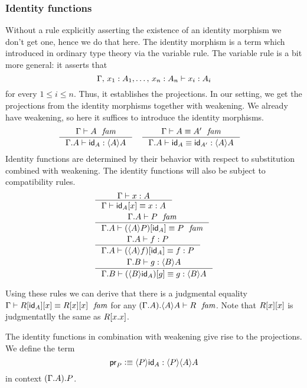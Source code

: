 \subsubsection{Identity functions}
Without a rule explicitly asserting the existence of an identity morphism we don't
get one, hence we do that here. The identity morphism is a term which introduced
in ordinary type theory via the variable rule. The variable rule is a bit more
general: it asserts that
\begin{equation*}
\jterm{\Gamma,\,x_1:A_1,\ldots,\,x_n:A_n}{A_i}{x_i}
\end{equation*}
for every $1\leq i\leq n$. Thus, it establishes the projections. In our setting,
we get the projections from the identity morphisms together with weakening. We
already have weakening, so here it suffices to introduce the identity morphisms.
\begin{align}
& \inference{\jfam{\Gamma}{A}}{\jterm{\ctxext{\Gamma}{A}}{\ctxwk{A}{A}}{\idfunc[A]}}
& & \inference{\jfameq{\Gamma}{A}{A'}}{\jtermeq{\ctxext{\Gamma}{A}}{\ctxwk{A}{A}}{\idfunc[A]}{\idfunc[A']}}
\end{align}
Identity functions are determined by their behavior with respect to substitution combined with
weakening. The identity functions will also be subject to compatibility rules.
\begin{align}
& \inference{\jterm{\Gamma}{A}{x}}{\jtermeq{\Gamma}{A}{\subst{x}{\idfunc[A]}}{x}}\\
& \inference{\jfam{\ctxext{\Gamma}{A}}{P}}{\jfameq{\ctxext{\Gamma}{A}}{\subst{\idfunc[A]}{\ctxwk{A}{P}}}{P}}\\
& \inference{\jterm{\ctxext{\Gamma}{A}}{P}{f}}{\jtermeq{\ctxext{\Gamma}{A}}{P}{\subst{\idfunc[A]}{\ctxwk{A}{f}}}{f}} \\
& \inference{\jterm{\ctxext{\Gamma}{B}}{\ctxwk{B}{A}}{g}}{\jtermeq{\ctxext{\Gamma}{B}}{\ctxwk{B}{A}}{\subst{g}{\ctxwk{B}{\idfunc[A]}}}{g}}
\end{align}

Using these rules we can derive that there is a judgmental equality 
$\jfameq{\Gamma}{\subst{x}{{\idfunc[A]}{R}}}
{\subst{x}{{x}{R}}}$ for any $\jfam{\ctxext{{\Gamma}{A}}{\ctxwk{A}{A}}}{R}$. 
Note that $\subst{x}{{x}{R}}$ is judgmentatlly the same as
$\subst{\ctxext{x}{x}}{R}$.

The identity functions in combination with weakening give rise to the projections.
We define the term
\begin{equation*}
\proj P \defeq \ctxwk{P}{\idfunc[A]}:\ctxwk{P}{{A}{A}}
\end{equation*}
in context $\ctxext{{\Gamma}{A}}{P}$.

